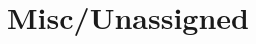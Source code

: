\documentclass[a4paper, 11pt]{article} %
\begin{document}


\section*{Misc/Unassigned}



\nocite{*}
{}


\end{document}
